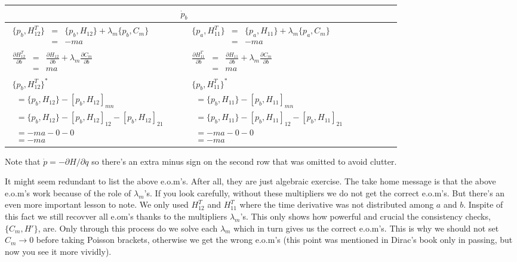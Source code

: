 \documentclass[aps,preprint,preprintnumbers,nofootinbib,showpacs,prd]{revtex4-1}
\newcommand{\ba}{\begin{array}}
\newcommand{\ea}{\end{array}}
\begin{document}
\begin{center}
    \begin{tabular}{ | l | l |}
    \hline
    \multicolumn{2}{|c|}{$\dot p_b$} \\
    \hline
    $\ba {rcl}
\{p_b, H^T_{12}\} & = & \{p_b, H_{12}\} + \lambda_m \{p_b, C_m\} \\
& = & -ma
\ea$
     &
    $\ba {rcl}
\{p_a, H^T_{11}\} & = & \{p_a, H_{11}\} + \lambda_m \{p_a, C_m\} \\
& = & -ma
\ea$
      \\ \cline{1-2}
    $\ba {rcl}
\frac{\partial H^T_{12}}{\partial b} & = & \frac{\partial H_{12}}{\partial b} + \lambda_m \frac{\partial C_m}{\partial b} \\
& = & ma
\ea$
      &
    $\ba {rcl}
 \frac{\partial H^T_{11}}{\partial b} & = & \frac{\partial H_{11}}{\partial b} + \lambda_m \frac{\partial C_m}{\partial b} \\
& = & ma
\ea$
      \\ \cline{1-2}
   $\ba {lcl}
\{p_b, H^T_{12}\}^* && \\
~~= \{p_b, H_{12}\} - [p_b, H_{12}]_{mn} && \\
~~= \{p_b, H_{12}\} - [p_b, H_{12}]_{12} - [p_b, H_{12}]_{21} && \\
~~= -ma -0 - 0 && \\
~~= -ma &&
\ea$
   & 
   $\ba {lcl}
\{p_b, H^T_{11}\}^* && \\
~~= \{p_b, H_{11}\} - [p_b, H_{11}]_{mn} && \\
~~= \{p_b, H_{11}\} - [p_b, H_{11}]_{12} - [p_b, H_{11}]_{21} && \\
~~= -ma -0 - 0 && \\
~~= -ma &&
   \ea$
     \\
    \hline
    \end{tabular}
\end{center}
Note that $\dot p = -\partial H/\partial q$ so there's an extra minus sign on the second row that was omitted to avoid clutter.

It might seem redundant to list the above e.o.m's. After all, they are just algebraic exercise. The take home message is that the above e.o.m's work because of the role of $\lambda_m$'s. If you look carefully, without these multipliers we do not get the correct e.o.m's. But there's an even more important lesson to note. We only used $H^T_{12}$ and $H^T_{11}$ where the time derivative was not distributed among $a$ and $b$. Inspite of this fact we still recovver all e.om's thanks to the multipliers $\lambda_m$'s. This only shows how powerful and crucial the consistency checks, $\{C_m, H'\}$, are. Only through this process do we solve each $\lambda_m$ which in turn gives us the correct e.o.m's. This is why we should not set $C_m \to 0$ before taking Poisson brackets, otherwise we get the wrong e.o.m's (this point was mentioned in Dirac's book only in passing, but now you see it more vividly).
\end{document}
